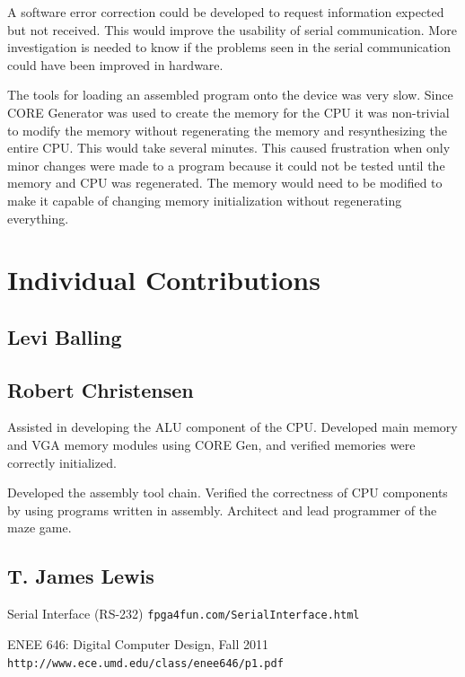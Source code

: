 \documentclass{article}
\begin{document}
A software error correction could be developed to request information expected but not received.  This would improve the usability of serial communication.  More investigation is needed to know if the problems seen in the serial communication could have been improved in hardware.

The tools for loading an assembled program onto the device was very slow.  Since CORE Generator was used to create the memory for the CPU it was non-trivial to modify the memory without regenerating the memory and resynthesizing the entire CPU.  This would take several minutes.  This caused frustration when only minor changes were made to a program because it could not be tested until the memory and CPU was regenerated.  The memory would need to be modified to make it capable of changing memory initialization without regenerating everything.

\section{Individual Contributions}

\subsection{Levi Balling}

\subsection{Robert Christensen}

Assisted in developing the ALU component of the CPU.  Developed main memory and VGA memory modules using CORE Gen, and verified memories were correctly initialized.

Developed the assembly tool chain.  Verified the correctness of CPU components by using programs written in assembly.  Architect and lead programmer of the maze game.

\subsection{T. James Lewis}

\begin{thebibliography}{99}

 Serial Interface (RS-232) \texttt{fpga4fun.com/SerialInterface.html}

ENEE 646: Digital Computer Design, Fall 2011 \texttt{http://www.ece.umd.edu/class/enee646/p1.pdf}

\end{thebibliography}
\end{document}
